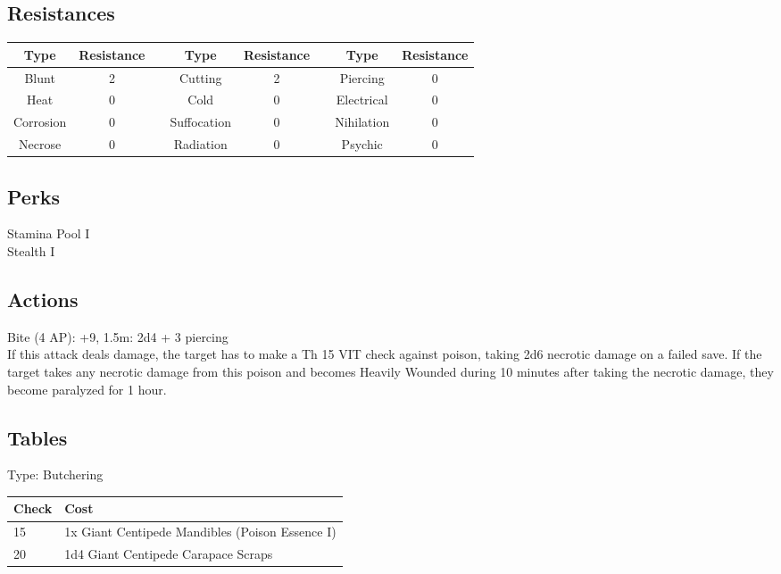 \subsection{Resistances}
\begin{minipage}[H]{1\textwidth}
	\centering
	\begin{tabular}[c]{|c | c | c | c | c | c | c | c|}
		\hline
		Type & Resistance && Type & Resistance && Type & Resistance\\
		\hline
		Blunt & 2 &&
		Cutting & 2 &&
		Piercing & 0\\
		Heat & 0 &&
		Cold & 0 &&
		Electrical & 0\\
		Corrosion & 0 &&
		Suffocation & 0 &&
		Nihilation & 0 \\
		Necrose & 0 &&
		Radiation & 0 &&
		Psychic & 0\\
		\hline
	\end{tabular}
\end{minipage}

\subsection{Perks}
Stamina Pool I\\
Stealth I\\

\subsection{Actions}
Bite (4 AP): +9, 1.5m: 2d4 + 3 piercing\\
If this attack deals damage, the target has to make a Th 15 VIT check against poison, taking 2d6 necrotic damage on a failed save.
If the target takes any necrotic damage from this poison and becomes Heavily Wounded during 10 minutes after taking the necrotic damage, they become paralyzed for 1 hour.

\subsection{Tables}
Type: Butchering
\\
\begin{minipage}{0.8\textwidth}
	\begin{tabular}{|l | l|}
		\hline
		Check & Cost\\
		\hline
		15 & 1x Giant Centipede Mandibles (Poison Essence I)\\
		20 & 1d4 Giant Centipede Carapace Scraps\\
		\hline
	\end{tabular}
\end{minipage}
\pagebreak
